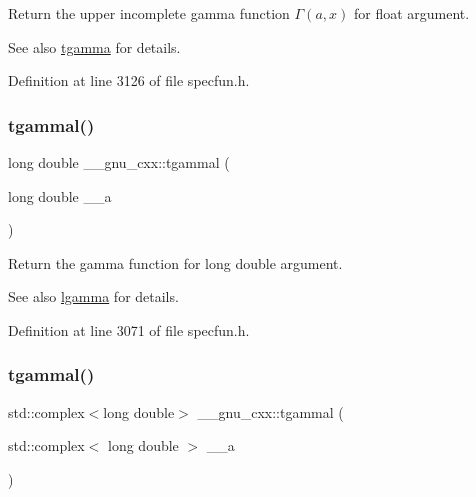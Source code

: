 Return the upper incomplete gamma function $ \Gamma(a,x) $ for {\ttfamily float} argument.

\begin{DoxySeeAlso}{See also}
\hyperlink{group__gnu__math__spec__func_ga73a634663e4eceb1e6bcf3fc16773b7b}{tgamma} for details. 
\end{DoxySeeAlso}


Definition at line 3126 of file specfun.\+h.

\mbox{\label{group__gnu__math__spec__func_ga2c7d954852d84665aabd43566d67e344}} 
\subsubsection{\texorpdfstring{tgammal()}{tgammal()}\hspace{0.1cm}{\footnotesize\ttfamily [1/3]}}
{\footnotesize\ttfamily long double \+\_\+\+\_\+gnu\+\_\+cxx\+::tgammal (\begin{DoxyParamCaption}\item[{long double}]{\+\_\+\+\_\+a }\end{DoxyParamCaption})\hspace{0.3cm}{\ttfamily [inline]}}

Return the gamma function for {\ttfamily  long double } argument.

\begin{DoxySeeAlso}{See also}
\hyperlink{group__gnu__math__spec__func_ga40fa5127f7c419ed1d8f1c6a6f96ea9b}{lgamma} for details. 
\end{DoxySeeAlso}


Definition at line 3071 of file specfun.\+h.

\mbox{\label{group__gnu__math__spec__func_ga8d53515dba9c860fd6058a4b75aaff58}} 
\subsubsection{\texorpdfstring{tgammal()}{tgammal()}\hspace{0.1cm}{\footnotesize\ttfamily [2/3]}}
{\footnotesize\ttfamily std\+::complex$<$long double$>$ \+\_\+\+\_\+gnu\+\_\+cxx\+::tgammal (\begin{DoxyParamCaption}\item[{std\+::complex$<$ long double $>$}]{\+\_\+\+\_\+a }\end{DoxyParamCaption})\hspace{0.3cm}{\ttfamily [inline]}}

